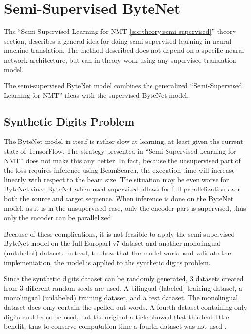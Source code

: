
\section{Semi-Supervised ByteNet}

The ``Semi-Supervised Learning for NMT \ref{sec:theory:semi-supervised}'' theory section, describes a general idea for doing semi-supervised learning in neural machine translation. The method described does not depend on a specific neural network architecture, but can in theory work using any supervised translation model.

The semi-supervised ByteNet model combines the generalized ``Semi-Supervised Learning for NMT'' ideas with the supervised ByteNet model.

\subsection{Synthetic Digits Problem}

The ByteNet model in itself is rather slow at learning, at least given the current state of TensorFlow. The strategy presented in ``Semi-Supervised Learning for NMT'' does not make this any better. In fact, because the unsupervised part of the loss requires inference using BeamSearch, the execution time will increase linearly with respect to the beam size. The situation may be even worse for ByteNet since ByteNet when used supervised allows for full parallelization over both the source and target sequence. When inference is done on the ByteNet model, as it is in the unsupervised case, only the encoder part is supervised, thus only the encoder can be parallelized.

Because of these complications, it is not feasible to apply the semi-supervised ByteNet model on the full Europarl v7 dataset and another monolingual (unlabeled) dataset. Instead, to show that the model works and validate the implementation, the model is applied to the synthetic digits problem.

Since the synthetic digits dataset can be randomly generated, 3 datasets created from 3 different random seeds are used. A bilingual (labeled) training dataset, a monolingual (unlabeled) training dataset, and a test dataset. The monolingual dataset does only contain the spelled out words. A fourth dataset containing only digits could also be used, but the original article showed that this had little benefit, thus to conserve computation time a fourth dataset was not used \cite{semi-supervised}.

